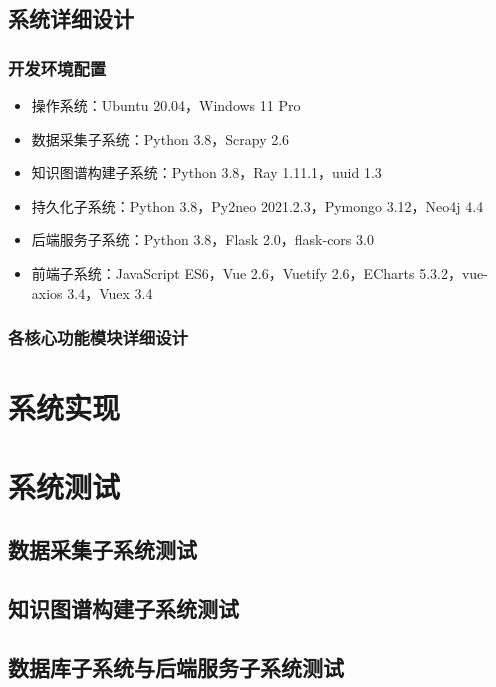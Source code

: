\documentclass[a4paper,AutoFakeBold,oneside,12pt]{book}
\begin{document}
\section{系统详细设计}

\subsection{开发环境配置}

\begin{itemize}
	\item 操作系统：Ubuntu 20.04，Windows 11 Pro
	\item 数据采集子系统：Python 3.8，Scrapy 2.6
	\item 知识图谱构建子系统：Python 3.8，Ray 1.11.1，uuid 1.3
	\item 持久化子系统：Python 3.8，Py2neo 2021.2.3，Pymongo 3.12，Neo4j 4.4
	\item 后端服务子系统：Python 3.8，Flask 2.0，flask-cors 3.0
	\item 前端子系统：JavaScript ES6，Vue 2.6，Vuetify 2.6，ECharts 5.3.2，vue-axios 3.4，Vuex 3.4
\end{itemize}

\subsection{各核心功能模块详细设计}

\chapter{系统实现}


\chapter{系统测试}

\section{数据采集子系统测试}

\section{知识图谱构建子系统测试}

\section{数据库子系统与后端服务子系统测试}
\end{document}
